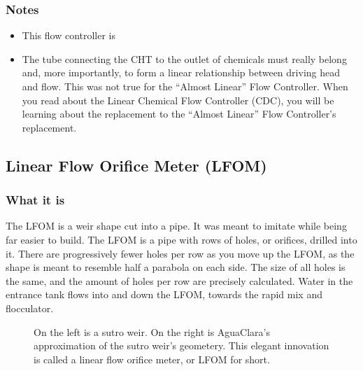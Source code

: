 \documentclass[letterpaper,10pt,english]{sphinxmanual}
\let\sphinxpxdimen\pdfpxdimen\else\newdimen\sphinxpxdimen
\begin{document}
\subsubsection{Notes}
\label{\detokenize{Flow_Control_and_Measurement/FCM_Design:notes}}\begin{itemize}
\item {} 
This flow controller is 

\item {} 
The tube connecting the CHT to the outlet of chemicals must really belong and, more importantly,  to form a linear relationship between driving head and flow. This was not true for the “Almost Linear” Flow Controller. When you read about the Linear Chemical Flow Controller (CDC), you will be learning about the replacement to the “Almost Linear” Flow Controller’s replacement.

\end{itemize}


\subsection{Linear Flow Orifice Meter (LFOM)}
\label{\detokenize{Flow_Control_and_Measurement/FCM_Design:linear-flow-orifice-meter-lfom}}\label{\detokenize{Flow_Control_and_Measurement/FCM_Design:heading-lfom}}

\subsubsection{What it is}
\label{\detokenize{Flow_Control_and_Measurement/FCM_Design:id1}}
The LFOM is a weir shape cut into a pipe. It was meant to imitate  while being far easier to build. The LFOM is a pipe with rows of holes, or orifices, drilled into it. There are progressively fewer holes per row as you move up the LFOM, as the shape is meant to resemble half a parabola on each side. The size of all holes is the same, and the amount of holes per row are precisely calculated. Water in the entrance tank flows into and down the LFOM, towards the rapid mix and flocculator.

\begin{figure}[htbp]
\centering
\capstart

\noindent\sphinxincludegraphics[width=600\sphinxpxdimen]{{sutro_v_lfom}.png}
\caption{On the left is a sutro weir. On the right is AguaClara’s approximation of the sutro weir’s geometery. This elegant innovation is called a linear flow orifice meter, or LFOM for short.}\label{\detokenize{Flow_Control_and_Measurement/FCM_Design:id9}}\label{\detokenize{Flow_Control_and_Measurement/FCM_Design:figure-sutro-v-lfom}}\end{figure}
\end{document}
